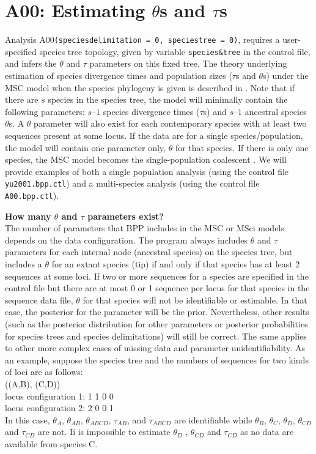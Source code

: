 \documentclass[a4paper]{book}
\numberwithin{equation}{section} \renewcommand{\baselinestretch}{0.55}
\begin{document}
 \section{A00: Estimating $\theta$s and $\tau$s} \label{a00} Analysis
 A00\texttt{(speciesdelimitation = 0, speciestree = 0)}, requires a
 user-specified species tree topology, given by variable
 \texttt{species\&tree} in the control file, and infers the $\theta$
 and $\tau$ parameters on this fixed tree.  The theory underlying
 estimation of species divergence times and population sizes ($\tau$s
 and $\theta$s) under the MSC model when the species phylogeny is
 given is described in \citep{Rannala2003}.  Note that if there are
 $s$ species in the species tree, the model will minimally contain the
 following parameters: $s – 1$ species divergence times ($\tau$s) and
 $s – 1$ ancestral species $\theta$s.  A $\theta$ parameter will also
 exist for each contemporary species with at least two sequences
 present at some locus. If the data are for a single
 species/population, the model will contain one parameter only,
 $\theta$ for that species. If there is only one species, the MSC
 model becomes the single-population coalescent
 \citep{Kingman1982}. We will provide examples of both a single
 population analysis (using the control file \texttt{yu2001.bpp.ctl})
 and a multi-species analysis (using the control file
 \texttt{A00.bpp.ctl}).


\begin{mdframed}
  \textbf{How many $\theta$ and $\tau$ parameters exist?} \\
  The number of parameters that \textsc{BPP} includes in the MSC or
  MSci models depends on the data configuration. The program always
  includes $\theta$ and $\tau$ parameters for each internal node
  (ancestral species) on the species tree, but includes a $\theta$ for
  an extant species (tip) if and only if that species has at least 2
  sequences at some loci.  If two or more sequences for a species are
  specified in the control file but there are at most 0 or 1 sequence
  per locus for that species in the sequence data file, $\theta$ for
  that species will not be identifiable or estimable.  In that case,
  the posterior for the parameter will be the prior.  Nevertheless,
  other results (such as the posterior distribution for other
  parameters or posterior probabilities for species trees and species
  delimitations) will still be correct.  The same applies to other
  more complex cases of missing data and parameter unidentifiability.
  As an example, suppose the species tree and the numbers of sequences
  for two kinds of loci are as follows: \\
  ((A,B), (C,D)) \\
  locus configuration 1:  1 1 0 0 \\
  locus configuration 2:  2 0 0 1 \\
  In this case, $\theta_A$, $\theta_{AB}$, $\theta_{ABCD}$,
  $\tau_{AB}$, and $\tau_{ABCD}$ are identifiable while $\theta_B$,
  $\theta_C$, $\theta_D$, $\theta_{CD}$ and $\tau_{CD}$ are not.  Ii
  is impossible to estimate $\theta_D$ , $\theta_{CD}$ and $\tau_{CD}$
  as no data are available from species C.
\end{mdframed}
\end{document}
